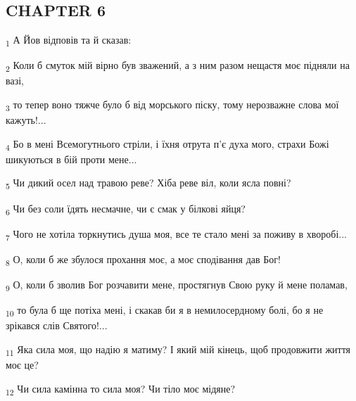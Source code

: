 \subsection{CHAPTER 6}
\begin{tcolorbox}
\textsubscript{1} А Йов відповів та й сказав:
\end{tcolorbox}
\begin{tcolorbox}
\textsubscript{2} Коли б смуток мій вірно був зважений, а з ним разом нещастя моє підняли на вазі,
\end{tcolorbox}
\begin{tcolorbox}
\textsubscript{3} то тепер воно тяжче було б від морського піску, тому нерозважне слова мої кажуть!...
\end{tcolorbox}
\begin{tcolorbox}
\textsubscript{4} Бо в мені Всемогутнього стріли, і їхня отрута п'є духа мого, страхи Божі шикуються в бій проти мене...
\end{tcolorbox}
\begin{tcolorbox}
\textsubscript{5} Чи дикий осел над травою реве? Хіба реве віл, коли ясла повні?
\end{tcolorbox}
\begin{tcolorbox}
\textsubscript{6} Чи без соли їдять несмачне, чи є смак у білкові яйця?
\end{tcolorbox}
\begin{tcolorbox}
\textsubscript{7} Чого не хотіла торкнутись душа моя, все те стало мені за поживу в хворобі...
\end{tcolorbox}
\begin{tcolorbox}
\textsubscript{8} О, коли б же збулося прохання моє, а моє сподівання дав Бог!
\end{tcolorbox}
\begin{tcolorbox}
\textsubscript{9} О, коли б зволив Бог розчавити мене, простягнув Свою руку й мене поламав,
\end{tcolorbox}
\begin{tcolorbox}
\textsubscript{10} то була б ще потіха мені, і скакав би я в немилосердному болі, бо я не зрікався слів Святого!...
\end{tcolorbox}
\begin{tcolorbox}
\textsubscript{11} Яка сила моя, що надію я матиму? І який мій кінець, щоб продовжити життя моє це?
\end{tcolorbox}
\begin{tcolorbox}
\textsubscript{12} Чи сила камінна то сила моя? Чи тіло моє мідяне?
\end{tcolorbox}
